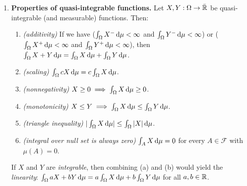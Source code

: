 \begin{enumerate}
\item \label{it:quasi-int-prop}\textbf{Properties of quasi-integrable functions.} Let
\(X,Y:\Omega\to\bar{\mathbb{R}}\) be quasi-integrable (and measurable) functions. Then:
\begin{enumerate}
\item \emph{(additivity)} If we have (\(\int_{\Omega}^{}X^{-}\odif{\mu}<\infty\) and
\(\int_{\Omega}^{}Y^{-}\odif{\mu}<\infty\)) or
(\(\int_{\Omega}^{}X^{+}\odif{\mu}<\infty\) and
\(\int_{\Omega}^{}Y^{+}\odif{\mu}<\infty\)), then \(\int_{\Omega}^{}X+Y\odif{\mu}
=\int_{\Omega}^{}X\odif{\mu}+\int_{\Omega}^{}Y\odif{\mu}\).
\item \emph{(scaling)} \(\int_{\Omega}^{}cX\odif{\mu}=c\int_{\Omega}^{}X\odif{\mu}\).
\item \emph{(nonnegativity)} \(X\ge 0\implies \int_{\Omega}^{}X\odif{\mu}\ge 0\).
\item \emph{(monotonicity)} \(X\le Y\implies \int_{\Omega}^{}X\odif{\mu}\le\int_{\Omega}^{}Y\odif{\mu}\).
\item \emph{(triangle inequality)} \(|\int_{\Omega}^{}X\odif{\mu}|\le\int_{\Omega}^{}|X|\odif{\mu}\).
\item \emph{(integral over null set is always zero)}
\(\int_{A}^{}X\odif{\mu}=0\) for every \(A\in\mathcal{F}\) with \(\mu(A)=0\).
\end{enumerate}
\begin{note}
If \(X\) and \(Y\) are \emph{integrable}, then combining (a) and (b) would
yield the \emph{linearity}:
\(\int_{\Omega}^{}aX+bY\odif{\mu}=a\int_{\Omega}^{}X\odif{\mu}+b\int_{\Omega}^{}Y\odif{\mu}\)
for all \(a,b\in\mathbb{R}\).
\end{note}


\end{enumerate}
